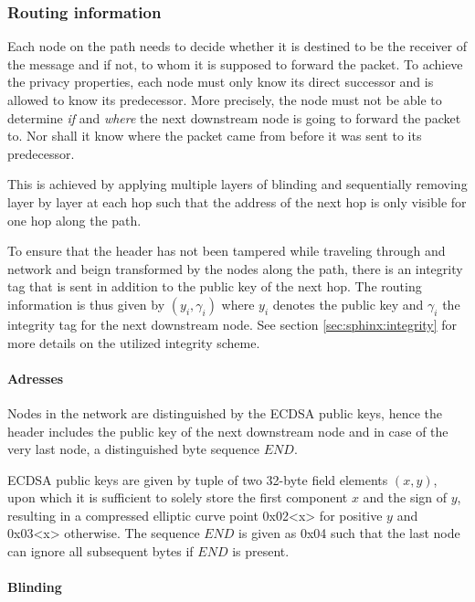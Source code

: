 \subsubsection{Routing information}
\label{sec:sphinx:routinginformation}

Each node on the path needs to decide whether it is destined to be the receiver of the message and if not, to whom it is supposed to forward the packet. To achieve the privacy properties, each node must only know its direct successor and is allowed to know its predecessor. More precisely, the node must not be able to determine \textit{if} and \textit{where} the next downstream node is going to forward the packet to. Nor shall it know where the packet came from before it was sent to its predecessor.

This is achieved by applying multiple layers of blinding and sequentially removing layer by layer at each hop such that the address of the next hop is only visible for one hop along the path.

To ensure that the header has not been tampered while traveling through and network and beign transformed by the nodes along the path, there is an integrity tag that is sent in addition to the public key of the next hop. The routing information is thus given by $(y_i, \gamma_i)$ where $y_i$ denotes the public key and $\gamma_i$ the integrity tag for the next downstream node. See section \ref{sec:sphinx:integrity} for more details on the utilized integrity scheme.

\paragraph{Adresses}

Nodes in the network are distinguished by the ECDSA public keys, hence the header includes the public key of the next downstream node and in case of the very last node, a distinguished byte sequence $END$.

ECDSA public keys are given by tuple of two 32-byte field elements $(x,y)$, upon which it is sufficient to solely store the first component $x$ and the sign of $y$, resulting in a \textsf{compressed} elliptic curve point \textsf{0x02}\textless\textsf{x}\textgreater{} for positive $y$ and \textsf{0x03}\textless\textsf{x}\textgreater{} otherwise. The sequence $END$ is given as \textsf{0x04} such that the last node can ignore all subsequent bytes if $END$ is present.

\paragraph{Blinding}

